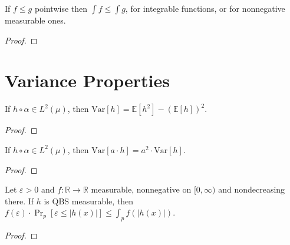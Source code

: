 \begin{lemma}\label{lem:qbs_integral_le}
  \rocqok
  If $f \leq g$ pointwise then $\int f \leq \int g$, for integrable functions, or for nonnegative measurable ones.
\end{lemma}
\begin{proof}\rocqok\end{proof}


\section{Variance Properties}\label{sec:variance_props}

\begin{lemma}\label{lem:qbs_varianceE}
  \rocqok
  If $h \circ \alpha \in L^2(\mu)$, then
  $\mathrm{Var}[h] = \mathbb{E}[h^2] - (\mathbb{E}[h])^2$.
\end{lemma}
\begin{proof}\rocqok\end{proof}

\begin{lemma}\label{lem:qbs_varianceZ}
  \rocqok
  If $h \circ \alpha \in L^2(\mu)$, then
  $\mathrm{Var}[a \cdot h] = a^2 \cdot \mathrm{Var}[h]$.
\end{lemma}
\begin{proof}\rocqok\end{proof}

\begin{lemma}\label{lem:qbs_markov}
  \rocqok
  Let $\varepsilon > 0$ and $f : \mathbb{R} \to \mathbb{R}$ measurable,
  nonnegative on $[0,\infty)$ and nondecreasing there. If $h$ is
  QBS measurable, then
  $f(\varepsilon) \cdot \Pr_p[\varepsilon \leq |h(x)|]
  \leq \int_p f(|h(x)|)$.
\end{lemma}
\begin{proof}\rocqok\end{proof}

